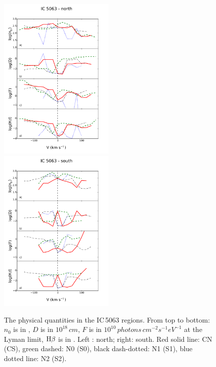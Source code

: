\documentclass[../thesis.tex]{subfiles}
\begin{document}
\begin{figure}
\includegraphics[width=0.5\textwidth]{images/paper1/icn.pdf}
\includegraphics[width=0.5\textwidth]{images/paper1/ics.pdf}
\caption{The physical quantities in the IC\,5063 regions. From top to bottom: $n_0$ is in , $D$ is in $10^{18}\,\si{cm}$, $F$ is in $10^{10}\,\si{photons\,cm^{-2} s^{-1} eV^{-1}}$ at the Lyman limit, $\rm H\beta$ is in \erg. Left : north; right: south. Red solid line: CN (CS), green dashed: N0 (S0), black dash-dotted: N1 (S1), blue dotted line: N2 (S2).}
\label{fig:IC_m}
\end{figure}
\end{document}
